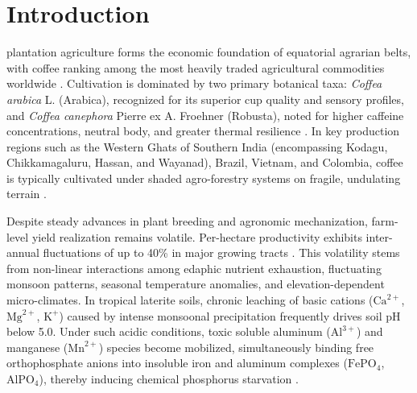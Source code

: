 \documentclass[conference]{IEEEtran}
\begin{document}
\section{Introduction}
 plantation agriculture forms the economic foundation of equatorial agrarian belts, with coffee ranking among the most heavily traded agricultural commodities worldwide \cite{ico2023}. Cultivation is dominated by two primary botanical taxa: \textit{Coffea arabica} L. (Arabica), recognized for its superior cup quality and sensory profiles, and \textit{Coffea canephora} Pierre ex A. Froehner (Robusta), noted for higher caffeine concentrations, neutral body, and greater thermal resilience \cite{davis2019}. In key production regions such as the Western Ghats of Southern India (encompassing Kodagu, Chikkamagaluru, Hassan, and Wayanad), Brazil, Vietnam, and Colombia, coffee is typically cultivated under shaded agro-forestry systems on fragile, undulating terrain \cite{coffeeboard2022}.

Despite steady advances in plant breeding and agronomic mechanization, farm-level yield realization remains volatile. Per-hectare productivity exhibits inter-annual fluctuations of up to 40\% in major growing tracts \cite{chemura2020}. This volatility stems from non-linear interactions among edaphic nutrient exhaustion, fluctuating monsoon patterns, seasonal temperature anomalies, and elevation-dependent micro-climates. In tropical laterite soils, chronic leaching of basic cations ($\text{Ca}^{2+}$, $\text{Mg}^{2+}$, $\text{K}^{+}$) caused by intense monsoonal precipitation frequently drives soil pH below 5.0. Under such acidic conditions, toxic soluble aluminum ($\text{Al}^{3+}$) and manganese ($\text{Mn}^{2+}$) species become mobilized, simultaneously binding free orthophosphate anions into insoluble iron and aluminum complexes ($\text{FePO}_4$, $\text{AlPO}_4$), thereby inducing chemical phosphorus starvation \cite{martins2021}.
\end{document}
